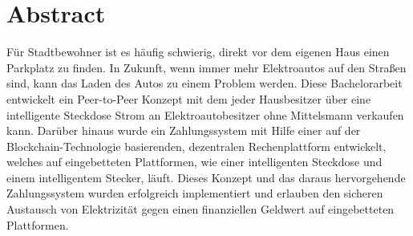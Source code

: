 \thispagestyle{empty}

\section*{Abstract}

Für Stadtbewohner ist es häufig schwierig, direkt vor dem eigenen Haus einen Parkplatz zu finden.
In Zukunft, wenn immer mehr Elektroautos auf den Straßen sind, kann das Laden des Autos zu einem Problem werden.
Diese Bachelorarbeit entwickelt ein Peer-to-Peer Konzept mit dem jeder Hausbesitzer über eine intelligente Steckdose Strom an Elektroautobesitzer ohne Mittelsmann verkaufen kann.
Darüber hinaus wurde ein Zahlungssystem mit Hilfe einer auf der Blockchain-Technologie basierenden, dezentralen Rechenplattform entwickelt, welches auf eingebetteten Plattformen, wie einer intelligenten Steckdose und einem intelligentem Stecker, läuft.
Dieses Konzept und das daraus hervorgehende Zahlungssystem wurden erfolgreich implementiert und erlauben den sicheren Austausch von Elektrizität gegen einen finanziellen Geldwert auf eingebetteten Plattformen.